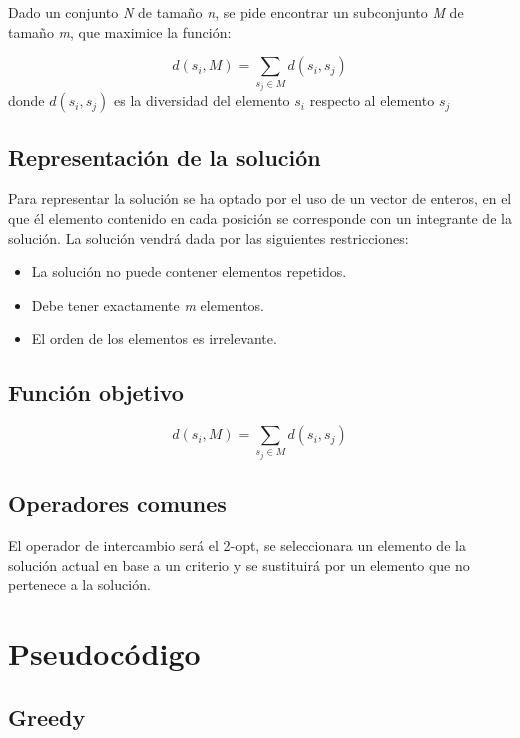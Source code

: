 \documentclass{article}
\begin{document}
	Dado un conjunto \emph{N} de tamaño \emph{n}, se pide encontrar un subconjunto \emph{M} de tamaño \emph{m}, que maximice
	la función: 
	
	\[ d(s_i,M)=\sum_{s_j \in M} d(s_i,s_j)\]
	donde  $d(s_i,s_j)$ es la diversidad del elemento $s_i$ respecto al elemento $s_j$
	
	\subsection{Representación de la solución}
	
	Para representar la solución se ha optado por el uso de un vector de enteros, en el que él elemento contenido en cada posición se corresponde con un integrante de la solución. La solución vendrá dada por las siguientes restricciones:
		\begin{itemize}
			
			\item La solución no puede contener elementos repetidos.
			
			\item Debe tener exactamente \emph{m} elementos.
			
			\item El orden de los elementos es irrelevante.
			
		\end{itemize}
	
	
	\subsection{Función objetivo}
	
	\[ d(s_i,M)=\sum_{s_j \in M} d(s_i,s_j)\]
	
	\subsection{Operadores comunes}
	
	El operador de intercambio será el 2-opt, se seleccionara un elemento de la solución actual en base a un criterio y se sustituirá por un elemento que no pertenece a la solución. 
	
	\section{Pseudocódigo}
	
	\subsection{Greedy}
	
\end{document}
